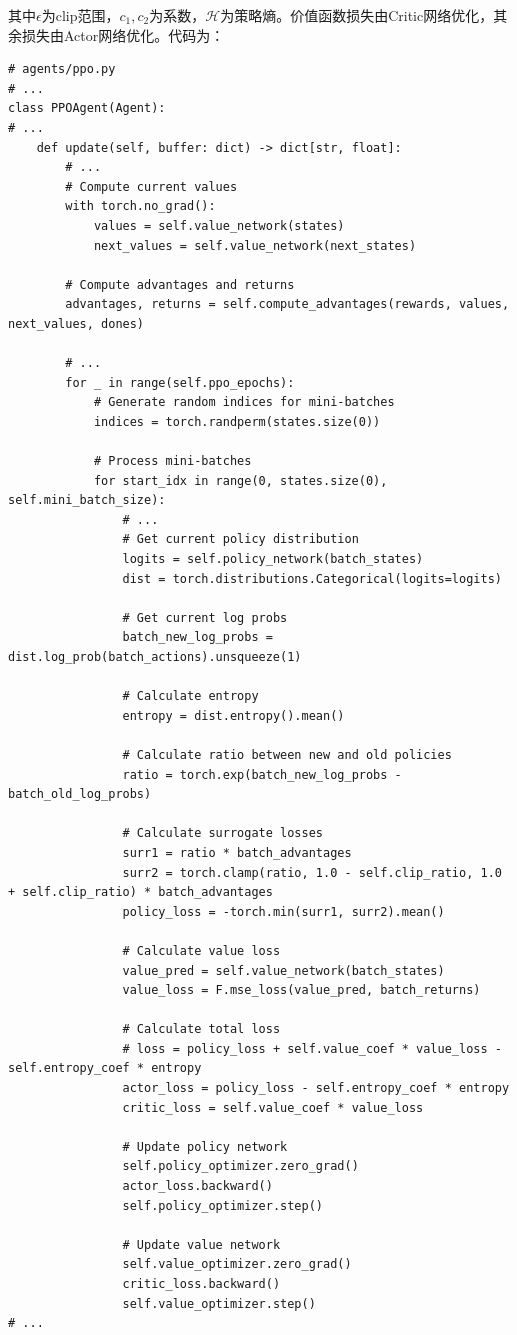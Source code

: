 \documentclass[12pt,a4paper]{article}
\begin{document}
其中$\epsilon$为clip范围，$c_1,c_2$为系数，$\mathcal{H}$为策略熵。价值函数损失由Critic网络优化，其余损失由Actor网络优化。代码为：
\begin{lstlisting}
# agents/ppo.py
# ...
class PPOAgent(Agent):
# ...
    def update(self, buffer: dict) -> dict[str, float]:
        # ...
        # Compute current values
        with torch.no_grad():
            values = self.value_network(states)
            next_values = self.value_network(next_states)

        # Compute advantages and returns
        advantages, returns = self.compute_advantages(rewards, values, next_values, dones)

        # ...
        for _ in range(self.ppo_epochs):
            # Generate random indices for mini-batches
            indices = torch.randperm(states.size(0))

            # Process mini-batches
            for start_idx in range(0, states.size(0), self.mini_batch_size):
                # ...
                # Get current policy distribution
                logits = self.policy_network(batch_states)
                dist = torch.distributions.Categorical(logits=logits)

                # Get current log probs
                batch_new_log_probs = dist.log_prob(batch_actions).unsqueeze(1)

                # Calculate entropy
                entropy = dist.entropy().mean()

                # Calculate ratio between new and old policies
                ratio = torch.exp(batch_new_log_probs - batch_old_log_probs)

                # Calculate surrogate losses
                surr1 = ratio * batch_advantages
                surr2 = torch.clamp(ratio, 1.0 - self.clip_ratio, 1.0 + self.clip_ratio) * batch_advantages
                policy_loss = -torch.min(surr1, surr2).mean()

                # Calculate value loss
                value_pred = self.value_network(batch_states)
                value_loss = F.mse_loss(value_pred, batch_returns)

                # Calculate total loss
                # loss = policy_loss + self.value_coef * value_loss - self.entropy_coef * entropy
                actor_loss = policy_loss - self.entropy_coef * entropy
                critic_loss = self.value_coef * value_loss

                # Update policy network
                self.policy_optimizer.zero_grad()
                actor_loss.backward()
                self.policy_optimizer.step()

                # Update value network
                self.value_optimizer.zero_grad()
                critic_loss.backward()
                self.value_optimizer.step()
# ...
\end{lstlisting}
\end{document}
